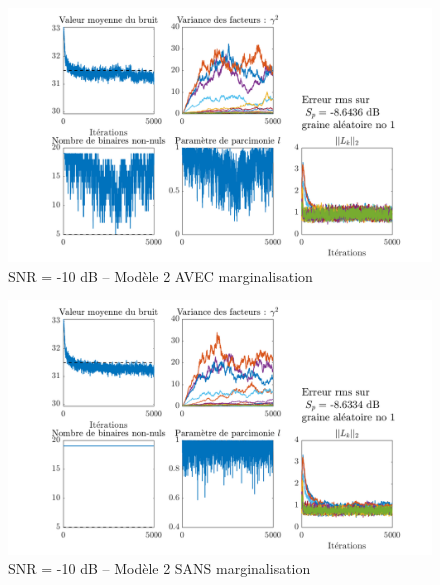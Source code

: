 \documentclass[ 12pt]{article}
\begin{document}
\begin{figure}[H]
	\centering
	\includegraphics[width=\textwidth]{ToyCase/margon_snrm10db.png}
	\caption{SNR = -10 dB -- Modèle 2 AVEC marginalisation}
\end{figure}
\begin{figure}[H]
	\centering
	\includegraphics[width=\textwidth]{ToyCase/margoff_snrm10db.png}
	\caption{SNR = -10 dB -- Modèle 2 SANS marginalisation}
\end{figure}
\end{document}

